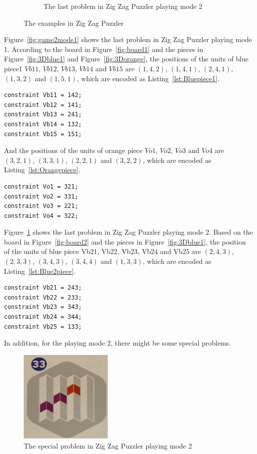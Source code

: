 \begin{figure}[htbp]
\begin{subfigure}[b]{.45\textwidth}
    \caption{The last problem in Zig Zag Puzzler playing mode 2}
    \label{fig:game2mode2}
     \end{subfigure}
     \caption{The examples in Zig Zag Puzzler}
     \label{fig:exampleszigzag}
\end{figure}
Figure~\ref{fig:game2mode1} shows the last problem in Zig Zag Puzzler playing mode 1. According to the board in Figure~\ref{fig:board1} and the pieces in Figure~\ref{fig:3Dblue1} and Figure~\ref{fig:3Dorange}, the positions of the units of blue piece1 $Vb11$, $Vb12$, $Vb13$, $Vb14$ and $Vb15$ are $(1,4,2)$, $(1,4,1)$, $(2,4,1)$, $(1,3,2)$ and $(1,5,1)$, which are encoded as Listing~\ref{lst:Bluepiece1}.
\begin{lstlisting}[language=minizinc,numbers=none,caption={Encoding for blue piece1's position of last problem in playing mode 1},label={lst:Bluepiece1}]
constraint Vb11 = 142;
constraint Vb12 = 141;
constraint Vb13 = 241;
constraint Vb14 = 132;
constraint Vb15 = 151;
\end{lstlisting}
\bigskip
\smallbreak
And the positions of the units of orange piece $Vo1$, $Vo2$, $Vo3$ and $Vo4$ are $(3,2,1)$, $(3,3,1)$, $(2,2,1)$ and $(3,2,2)$, which are encoded as Listing~\ref{lst:Orangepiece}.
\begin{lstlisting}[language=minizinc,numbers=none,caption={Encoding for orange piece's position of last problem in playing mode 1},label={lst:Orangepiece}]
constraint Vo1 = 321;
constraint Vo2 = 331;
constraint Vo3 = 221;
constraint Vo4 = 322;
\end{lstlisting}
\bigskip
\smallbreak
Figure~\ref{fig:game2mode2} shows the last problem in Zig Zag Puzzler playing mode 2. Based on the board in Figure~\ref{fig:board2} and the pieces in Figure~\ref{fig:3Dblue1}, the position of the units of blue piece Vb21, Vb22, Vb23, Vb24 and Vb25 are $(2,4,3)$, $(2,3,3)$, $(3,4,3)$, $(3,4,4)$ and $(1,3,3)$, which are encoded as Listing~\ref{lst:Blue2piece}.
\begin{lstlisting}[language=minizinc,numbers=none,caption={Encoding for blue piece2's position of last problem in playing mode 2},label={lst:Blue2piece}]
constraint Vb21 = 243;
constraint Vb22 = 233;
constraint Vb23 = 343;
constraint Vb24 = 344;
constraint Vb25 = 133;
\end{lstlisting}
\bigskip
\smallbreak
In addition, for the playing mode 2, there might be some special problems.
\begin{figure}[htbp]
    \centering
    \includegraphics[width=0.4\textwidth]{figs/specialcase.jpg}
    \caption{The special problem in Zig Zag Puzzler playing mode 2}
    \label{fig:specialcase}
\end{figure}
